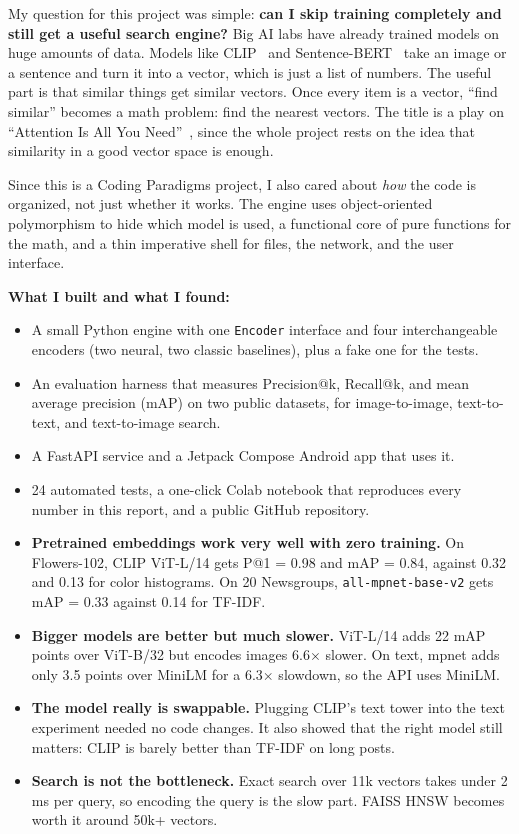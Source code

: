 \documentclass{article}
\begin{document}
My question for this project was simple: \textbf{can I skip training completely and still get a useful search engine?} Big AI labs have already trained models on huge amounts of data. Models like CLIP~\cite{radford2021clip} and Sentence-BERT~\cite{reimers2019sbert} take an image or a sentence and turn it into a vector, which is just a list of numbers. The useful part is that similar things get similar vectors. Once every item is a vector, ``find similar'' becomes a math problem: find the nearest vectors. The title is a play on ``Attention Is All You Need''~\cite{vaswani2017attention}, since the whole project rests on the idea that similarity in a good vector space is enough.

Since this is a Coding Paradigms project, I also cared about \emph{how} the code is organized, not just whether it works. The engine uses object-oriented polymorphism to hide which model is used, a functional core of pure functions for the math, and a thin imperative shell for files, the network, and the user interface.

\textbf{What I built and what I found:}
\begin{itemize}
  \item A small Python engine with one \texttt{Encoder} interface and four interchangeable encoders (two neural, two classic baselines), plus a fake one for the tests.
  \item An evaluation harness that measures Precision@k, Recall@k, and mean average precision (mAP) on two public datasets, for image-to-image, text-to-text, and text-to-image search.
  \item A FastAPI service and a Jetpack Compose Android app that uses it.
  \item 24 automated tests, a one-click Colab notebook that reproduces every number in this report, and a public GitHub repository.
  \item \textbf{Pretrained embeddings work very well with zero training.} On Flowers-102, CLIP ViT-L/14 gets P@1 = 0.98 and mAP = 0.84, against 0.32 and 0.13 for color histograms. On 20 Newsgroups, \texttt{all-mpnet-base-v2} gets mAP = 0.33 against 0.14 for TF-IDF.
  \item \textbf{Bigger models are better but much slower.} ViT-L/14 adds 22 mAP points over ViT-B/32 but encodes images 6.6$\times$ slower. On text, mpnet adds only 3.5 points over MiniLM for a 6.3$\times$ slowdown, so the API uses MiniLM.
  \item \textbf{The model really is swappable.} Plugging CLIP's text tower into the text experiment needed no code changes. It also showed that the right model still matters: CLIP is barely better than TF-IDF on long posts.
  \item \textbf{Search is not the bottleneck.} Exact search over 11k vectors takes under 2\,ms per query, so encoding the query is the slow part. FAISS HNSW becomes worth it around 50k+ vectors.
\end{itemize}
\end{document}

